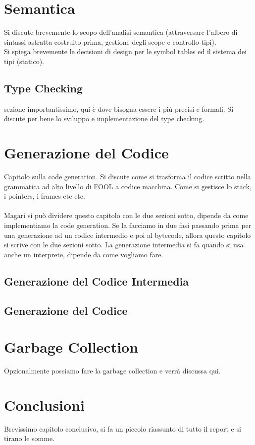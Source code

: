 \documentclass{scrreprt}
\begin{document}
\chapter{Semantica}
Si discute brevemente lo scopo dell'analisi semantica (attraversare l'albero di sintassi astratta costruito prima, gestione
degli scope e controllo tipi).\\
Si spiega brevemente le decisioni di design per le symbol tables ed il sistema dei tipi (statico).
\section{Type Checking}
sezione importantissimo, qui è dove bisogna essere i più precisi e formali. Si discute per bene lo sviluppo
e implementazione del type checking.

\chapter{Generazione del Codice}
Capitolo sulla code generation. Si discute come si trasforma il codice scritto nella grammatica
ad alto livello di FOOL a codice macchina. Come si gestisce lo stack, i pointers, i frames etc etc.\\
\\
Magari si può dividere questo capitolo con le due sezioni sotto, dipende da come implementiamo la code 
generation. Se la facciamo in due fasi passando prima per una generazione ad un codice intermedio e 
poi al bytecode, allora questo capitolo si scrive con le due sezioni sotto.
La generazione intermedia si fa quando si usa anche un interprete, dipende da come vogliamo fare.
\section{Generazione del Codice Intermedia}
\section{Generazione del Codice}

\chapter{Garbage Collection}
Opzionalmente possiamo fare la garbage collection e verrà discussa qui.

\chapter{Conclusioni}
Brevissimo capitolo conclusivo, si fa un piccolo riassunto di tutto il report e si tirano le somme.
\end{document}
